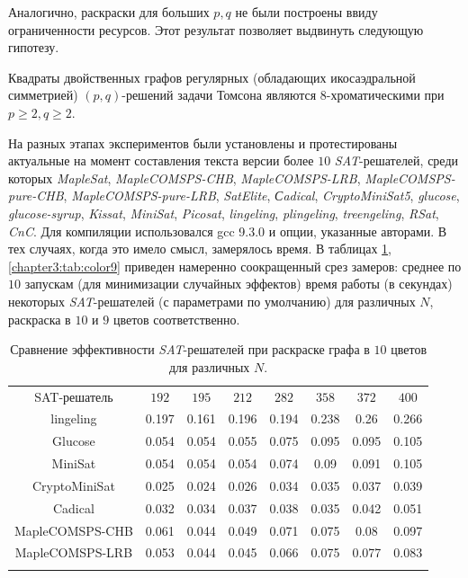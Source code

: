 Аналогично, раскраски для больших $p,q$ не были построены ввиду ограниченности ресурсов. 
Этот результат позволяет выдвинуть следующую гипотезу.

\begin{hypothesis}
Квадраты двойственных графов регулярных (обладающих икосаэдральной симметрией) $(p,q)$-решений задачи Томсона  
являются $8$-хроматическими при $p \ge 2, q \ge 2$.
\end{hypothesis}

На разных этапах экспериментов были установлены и протестированы актуальные на момент составления текста 
версии более $10$ \textit{SAT}-решателей, среди которых
\textit{MapleSat},
\textit{Maple\-COM\-SPS-CHB},
\textit{Maple\-COM\-SPS-LRB},
\textit{Maple\-COM\-SPS-pure-CHB},
\textit{Maple\-COM\-SPS-pure-LRB},
\textit{Sat\-Elite},
\textit{Сadical},
\textit{Crypto\-Mini\-Sat5},
\textit{glu\-co\-se},
\textit{glucose-syrup},
\textit{Kissat},
\textit{Mini\-Sat},
\textit{Picosat},
\textit{lin\-ge\-ling},
\textit{plin\-ge\-ling},
\textit{treen\-ge\-ling},
\textit{RSat},
\textit{CnC}. 
Для компиляции использовался gcc 9.3.0 и опции, указанные авторами. 
В тех случаях, когда это имело смысл, замерялось время. 
В таблицах \ref{chapter3:tab:color10}, \ref{chapter3:tab:color9} 
приведен намеренно соокращенный срез замеров: 
среднее по $10$ запускам (для минимизации случайных эффектов) 
время работы (в секундах) некоторых \textit{SAT}-решателей (с параметрами по умолчанию) 
для различных $N$, раскраска в $10$ и $9$ цветов соответственно.

\begin{table}[h!]
\centering
\captionsetup{justification=centering}
\caption{Сравнение эффективности \textit{SAT}-решателей при раскраске графа в $10$ цветов для различных $N$.} 
\label{chapter3:tab:color10}
\begin{tabular}{@{}|c|c|c|c|c|c|c|c|} 
\Xhline{4\arrayrulewidth}
SAT-решатель          & $192$ & $195$ & $212$ & $282$ & $358$ & $372$ & $400$ \\ \Xhline{4\arrayrulewidth}
lingeling             & 0.197 & 0.161 & 0.196 & 0.194 & 0.238 & 0.26  & 0.266 \\ \hline
Glucose               & 0.054 & 0.054 & 0.055 & 0.075 & 0.095 & 0.095 & 0.105 \\ \hline
MiniSat               & 0.054 & 0.054 & 0.054 & 0.074 & 0.09  & 0.091 & 0.105 \\ \hline
CryptoMiniSat         & 0.025 & 0.024 & 0.026 & 0.034 & 0.035 & 0.037 & 0.039 \\ \hline
Cadical               & 0.032 & 0.034 & 0.037 & 0.038 & 0.035 & 0.042 & 0.051 \\ \hline
MapleCOMSPS-CHB       & 0.061 & 0.044 & 0.049 & 0.071 & 0.075 & 0.08  & 0.097 \\ \hline
MapleCOMSPS-LRB       & 0.053 & 0.044 & 0.045 & 0.066 & 0.075 & 0.077 & 0.083 \\ \Xhline{4\arrayrulewidth}
\end{tabular}
\end{table}

